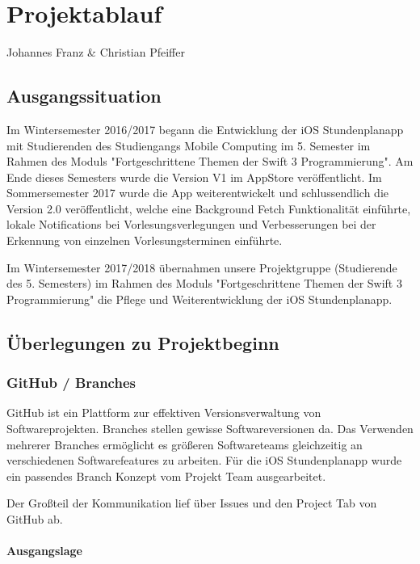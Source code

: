 \chapter{Projektablauf}
Johannes Franz \& Christian Pfeiffer

\section{Ausgangssituation}

Im Wintersemester 2016/2017 begann die Entwicklung der iOS Stundenplanapp mit Studierenden des Studiengangs Mobile Computing im 5. Semester im Rahmen des Moduls "Fortgeschrittene Themen der Swift 3 Programmierung". Am Ende dieses Semesters wurde die Version V1 im AppStore veröffentlicht. Im Sommersemester 2017 wurde die App weiterentwickelt und schlussendlich die Version 2.0 veröffentlicht, welche eine Background Fetch Funktionalität einführte, lokale Notifications bei Vorlesungsverlegungen und Verbesserungen bei der Erkennung von einzelnen Vorlesungsterminen einführte.

Im Wintersemester 2017/2018 übernahmen unsere Projektgruppe (Studierende des 5. Semesters) im Rahmen des Moduls "Fortgeschrittene Themen der Swift 3 Programmierung" die Pflege und Weiterentwicklung der iOS Stundenplanapp.


\newpage
\section{Überlegungen zu Projektbeginn}

\subsection{GitHub / Branches}
GitHub ist ein Plattform zur effektiven Versionsverwaltung von Softwareprojekten. Branches stellen gewisse Softwareversionen da. Das Verwenden mehrerer Branches ermöglicht es größeren Softwareteams gleichzeitig an verschiedenen Softwarefeatures zu arbeiten.
Für die iOS Stundenplanapp wurde ein passendes Branch Konzept vom Projekt Team ausgearbeitet.

Der Großteil der Kommunikation lief über Issues und den Project Tab von GitHub ab.

\subsubsection{Ausgangslage}

